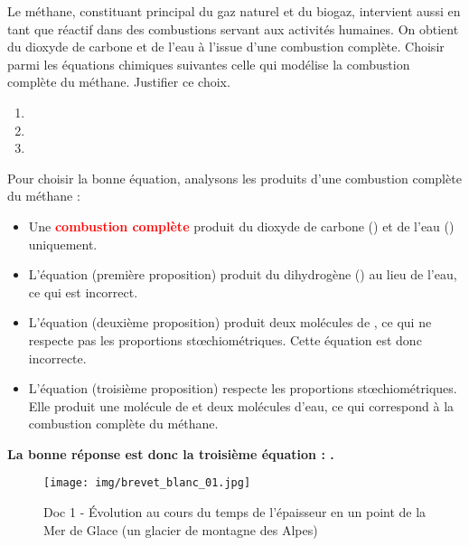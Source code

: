 \documentclass[answers]{exam}
\begin{document}
\begin{questions}
  \question[2] Le méthane, constituant principal du gaz naturel et du biogaz, intervient aussi en tant que réactif dans des combustions servant aux activités humaines. On obtient du dioxyde de carbone et de l'eau à l'issue d'une combustion complète. Choisir parmi les équations chimiques suivantes celle qui modélise la combustion complète du méthane. Justifier ce choix.
  \begin{enumerate}
    \item {}
    \item {}
    \item {}
  \end{enumerate}
  \begin{solution}
    Pour choisir la bonne équation, analysons les produits d'une combustion complète du méthane :
    \begin{itemize}[noitemsep]
        \item Une \textcolor{red}{\textbf{combustion complète}} produit du dioxyde de carbone () et de l'eau () uniquement.
        \item L'équation \textbf{} (première proposition) produit du dihydrogène () au lieu de l'eau, ce qui est incorrect.
        \item L'équation \textbf{} (deuxième proposition) produit deux molécules de , ce qui ne respecte pas les proportions stœchiométriques. Cette équation est donc incorrecte.
        \item L'équation \textbf{} (troisième proposition) respecte les proportions stœchiométriques. Elle produit une molécule de  et deux molécules d'eau, ce qui correspond à la combustion complète du méthane.
    \end{itemize}
    \textbf{La bonne réponse est donc la troisième équation : .}
  \end{solution}

\end{questions}

\begin{figure}[H]
  \centering
  \texttt{[image: img/brevet\_blanc\_01.jpg]}
  \captionsetup{labelformat=empty}
  \caption{\label{} Doc 1 - Évolution au cours du temps de l'épaisseur en un point de la Mer de Glace (un
  glacier de montagne des Alpes)}
\end{figure} 
\end{document}
